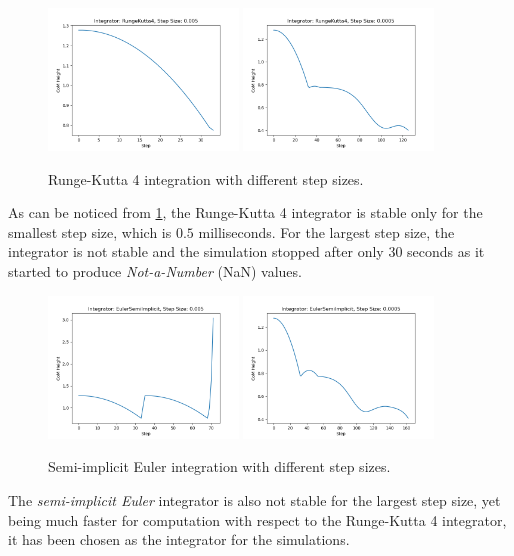 \begin{figure}
    \centering
    \caption{Runge-Kutta 4 integration with different step sizes.}
    \label{fig:rk4}
    \includegraphics[width=0.45\textwidth]{Images/rk4_5ms.png}
    \includegraphics[width=0.45\textwidth]{Images/rk4_05ms.png}
\end{figure}

As can be noticed from \cref{fig:rk4}, the Runge-Kutta 4 integrator is stable only for the smallest step size, which is $0.5$ milliseconds. For the largest step size, the integrator is not stable and the simulation stopped after only $30$ seconds as it started to produce \textit{Not-a-Number} (NaN) values.

\begin{figure}
    \centering
    \caption{Semi-implicit Euler integration with different step sizes.}
    \label{fig:sie}
    \includegraphics[width=0.45\textwidth]{Images/sie_5ms.png}
    \includegraphics[width=0.45\textwidth]{Images/sie_05ms.png}
\end{figure}

The \textit{semi-implicit Euler} integrator is also not stable for the largest step size, yet being much faster for computation with respect to the Runge-Kutta 4 integrator, it has been chosen as the integrator for the simulations.